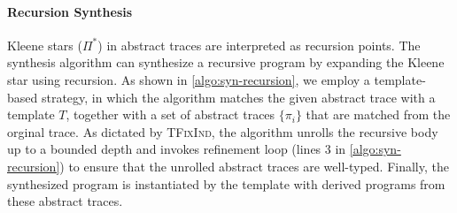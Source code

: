 \begin{algorithm}[t!]
  \caption{Synthesis of Recursive Programs}
  \label{algo:syn-recursion}
\end{algorithm}

\paragraph{Recursion Synthesis} Kleene stars ($\Pi^*$) in abstract
traces are interpreted as recursion points. The synthesis algorithm
can synthesize a recursive program by expanding the Kleene star using
recursion. As shown in \autoref{algo:syn-recursion}, we employ a
template-based strategy, in which the algorithm matches the given
abstract trace with a template $T$, together with a set of abstract
traces $\{\pi_i\}$ that are matched from the orginal trace. As
dictated by \textsc{TFixInd}, the algorithm unrolls the recursive body
up to a bounded depth and invokes refinement loop (lines 3 in
\autoref{algo:syn-recursion}) to ensure that the unrolled abstract
traces are well-typed.  Finally, the synthesized program is
instantiated by the template with derived programs from these abstract
traces.

